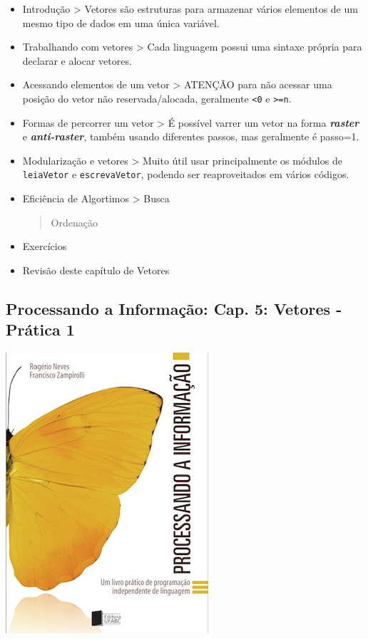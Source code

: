 \documentclass[12pt,a4paper]{article}
\begin{document}
\begin{itemize}
\item
  Introdução \textgreater{} Vetores são estruturas para armazenar vários
  elementos de um mesmo tipo de dados em uma única variável.
\item
  Trabalhando com vetores \textgreater{} Cada linguagem possui uma
  sintaxe própria para declarar e alocar vetores.
\item
  Acessando elementos de um vetor \textgreater{} ATENÇÃO para não
  acessar uma posição do vetor não reservada/alocada, geralmente
  \texttt{\textless{}0} e \texttt{\textgreater{}=n}.
\item
  Formas de percorrer um vetor \textgreater{} É possível varrer um vetor
  na forma \textbf{\emph{raster}} e \textbf{\emph{anti-raster}}, também
  usando diferentes passos, mas geralmente é passo=1.
\item
  Modularização e vetores \textgreater{} Muito útil usar principalmente
  os módulos de \texttt{leiaVetor} e \texttt{escrevaVetor}, podendo ser
  reaproveitados em vários códigos.
\item
  Eficiência de Algortimos \textgreater{} Busca

  \begin{quote}
  Ordenação
  \end{quote}
\item
  Exercícios
\item
  Revisão deste capítulo de Vetores
\end{itemize}

    \hypertarget{processando-a-informauxe7uxe3o-cap.-5-vetores---pruxe1tica-1}{%
\subsection{Processando a Informação: Cap. 5: Vetores - Prática
1}\label{processando-a-informauxe7uxe3o-cap.-5-vetores---pruxe1tica-1}}

    \includegraphics{"figs/Capa_Processando_Informacao.jpg"}
\end{document}

